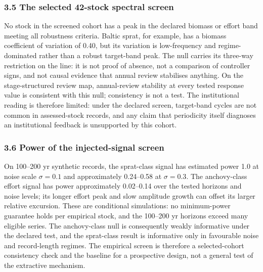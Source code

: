 \documentclass[11pt]{article}
\begin{document}
\subsubsection{3.5 The selected 42-stock spectral
screen}\label{the-selected-42-stock-spectral-screen}

No stock in the screened cohort has a peak in the declared biomass or
effort band meeting all robustness criteria. Baltic sprat, for example,
has a biomass coefficient of variation of 0.40, but its variation is
low-frequency and regime-dominated rather than a robust target-band
peak. The null carries its three-way restriction on the line: it is not
proof of absence, not a comparison of controller signs, and not causal
evidence that annual review stabilises anything. On the stage-structured
review map, annual-review stability at every tested response value is
consistent with this null; consistency is not a test. The institutional
reading is therefore limited: under the declared screen, target-band
cycles are not common in assessed-stock records, and any claim that
periodicity itself diagnoses an institutional feedback is unsupported by
this cohort.

\subsubsection{3.6 Power of the injected-signal
screen}\label{power-of-the-injected-signal-screen}

On 100--200 yr synthetic records, the sprat-class signal has estimated
power 1.0 at noise scale \(\sigma=0.1\) and approximately 0.24--0.58 at
\(\sigma=0.3\). The anchovy-class effort signal has power approximately
0.02--0.14 over the tested horizons and noise levels; its longer effort
peak and slow amplitude growth can offset its larger relative excursion.
These are conditional simulations: no minimum-power guarantee holds per
empirical stock, and the 100--200 yr horizons exceed many eligible
series. The anchovy-class null is consequently weakly informative under
the declared test, and the sprat-class result is informative only in
favourable noise and record-length regimes. The empirical screen is
therefore a selected-cohort consistency check and the baseline for a
prospective design, not a general test of the extractive mechanism.
\end{document}
